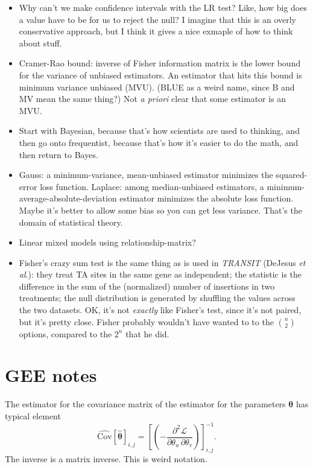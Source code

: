 \documentclass{book}
\begin{document}
\begin{itemize}
\item Why can't we make confidence intervals with the LR test? Like, how big does a value have to be for us to reject the null? I imagine that this is an overly conservative approach, but I think it gives a nice exmaple of how to think about stuff.
\item
  Cramer-Rao bound: inverse of Fisher information matrix is the lower
  bound for the variance of unbiased estimators. An estimator that hits
  this bound is minimum variance unbiased (MVU). (BLUE as a weird name,
  since B and MV mean the same thing?) Not \emph{a priori} clear that
  some estimator is an MVU.
\item
  Start with Bayesian, because that's how scientists are used to
  thinking, and then go onto frequentist, because that's how it's easier
  to do the math, and then return to Bayes.
\item
  Gauss: a minimum-variance, mean-unbiased estimator minimizes the
  squared-error loss function. Laplace: among median-unbiased
  estimators, a minimum-average-absolute-deviation estimator minimizes
  the absolute loss function. Maybe it's better to allow some bias so
  you can get less variance. That's the domain of statistical theory.
\item
  Linear mixed models using relationship-matrix?
\item
  Fisher's crazy sum test is the same thing as is used in \emph{TRANSIT}
  (DeJesus \emph{et al}.): they treat TA sites in the same gene as
  independent; the statistic is the difference in the sum of the
  (normalized) number of insertions in two treatments; the null
  distribution is generated by shuffling the values across the two
  datasets. OK, it's not \emph{exactly} like Fisher's test, since it's
  not paired, but it's pretty close. Fisher probably wouldn't have
  wanted to to the \(\binom{n}{2}\) options, compared to the \(2^n\)
  that he did.
\end{itemize}

\section{GEE notes}\label{gee-notes}

The estimator for the covariance matrix of the estimator for the
parameters \(\bm{\theta}\) has typical element \[
\widehat{\mathrm{Cov}}[\hat{\bm{\theta}}]_{i,j} =
  \left[ \left( -\frac{\partial^2 \mathcal{L}}{\partial \theta_u \, \partial \theta_v} \right) \right]^{-1}_{i,j}.
\] The inverse is a matrix inverse. This is weird notation.
\end{document}

